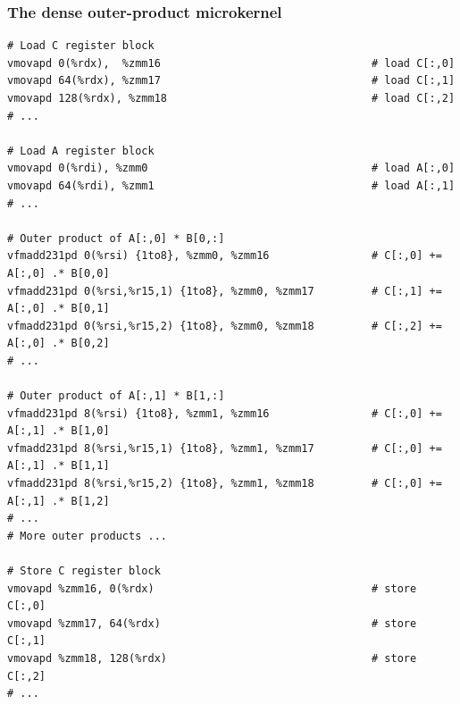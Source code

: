 \documentclass[9pt]{beamer}
\begin{document}
\begin{frame}[fragile]
  \frametitle{The dense outer-product microkernel}
  \begin{verbatim}
# Load C register block
vmovapd 0(%rdx),  %zmm16                                 # load C[:,0]
vmovapd 64(%rdx), %zmm17                                 # load C[:,1]
vmovapd 128(%rdx), %zmm18                                # load C[:,2]
# ...

# Load A register block
vmovapd 0(%rdi), %zmm0                                   # load A[:,0]
vmovapd 64(%rdi), %zmm1                                  # load A[:,1]
# ...

# Outer product of A[:,0] * B[0,:]
vfmadd231pd 0(%rsi) {1to8}, %zmm0, %zmm16                # C[:,0] += A[:,0] .* B[0,0]
vfmadd231pd 0(%rsi,%r15,1) {1to8}, %zmm0, %zmm17         # C[:,1] += A[:,0] .* B[0,1]
vfmadd231pd 0(%rsi,%r15,2) {1to8}, %zmm0, %zmm18         # C[:,2] += A[:,0] .* B[0,2]
# ...

# Outer product of A[:,1] * B[1,:]
vfmadd231pd 8(%rsi) {1to8}, %zmm1, %zmm16                # C[:,0] += A[:,1] .* B[1,0]
vfmadd231pd 8(%rsi,%r15,1) {1to8}, %zmm1, %zmm17         # C[:,0] += A[:,1] .* B[1,1]
vfmadd231pd 8(%rsi,%r15,2) {1to8}, %zmm1, %zmm18         # C[:,0] += A[:,1] .* B[1,2]
# ...
# More outer products ...

# Store C register block
vmovapd %zmm16, 0(%rdx)                                  # store C[:,0]
vmovapd %zmm17, 64(%rdx)                                 # store C[:,1]
vmovapd %zmm18, 128(%rdx)                                # store C[:,2]
# ...
    
  \end{verbatim}
\end{frame}

\end{document}
